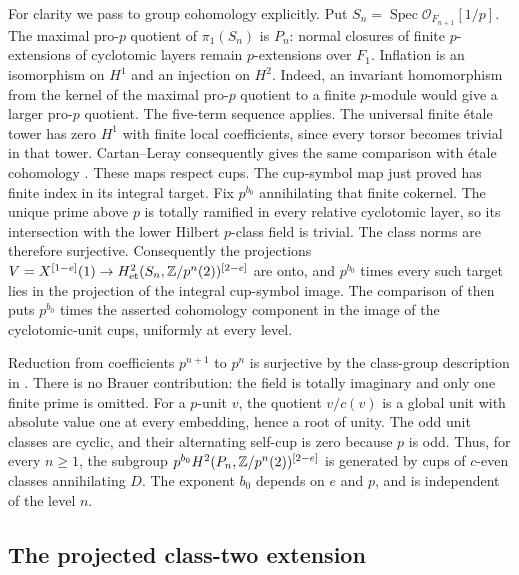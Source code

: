 

For clarity we pass to group cohomology explicitly.
Put $S_n=\operatorname{Spec}\mathcal O_{F_{n+1}}[1/p]$.
The maximal pro-$p$ quotient of $\pi_1(S_n)$ is $P_n$:
normal closures of finite $p$-extensions of cyclotomic layers
remain $p$-extensions over $F_1$.
Inflation is an isomorphism on $H^1$ and an injection on $H^2$.
Indeed, an invariant homomorphism from the kernel of the
maximal pro-$p$ quotient to a finite $p$-module would give
a larger pro-$p$ quotient. The five-term sequence applies.
The universal finite \'etale tower has zero $H^1$ with finite
local coefficients, since every torsor becomes trivial in
that tower. Cartan--Leray consequently gives the same comparison
with \'etale cohomology \cite[Theorem~14.9 and
Proposition~14.13, pp.~96--98]{MilneEtale}.
These maps respect cups. The cup-symbol map just proved has
finite index in its integral target. Fix $p^{b_0}$ annihilating
that finite cokernel. The unique prime above $p$ is totally
ramified in every relative cyclotomic layer, so its intersection
with the lower Hilbert $p$-class field is trivial. The class norms
are therefore surjective. Consequently the projections
$V=X^{[1-e]}(1)\to H^2_{\mathrm{et}}(S_n,\mathbb Z/p^n(2))^{[2-e]}$
are onto, and $p^{b_0}$ times every such target lies in the
projection of the integral cup-symbol image. The comparison of
\cite[\S\S7.1.9--7.1.10, p.~86]{FK} then puts
$p^{b_0}$ times the asserted cohomology component in the image
of the cyclotomic-unit cups, uniformly at every level.

Reduction from coefficients $p^{n+1}$ to $p^n$ is surjective
by the class-group description in \cite[\S7.1.9]{FK}.
There is no Brauer contribution: the field is totally imaginary
and only one finite prime is omitted.
For a $p$-unit $v$, the quotient $v/c(v)$ is a global unit
with absolute value one at every embedding, hence a root of
unity. The odd unit classes are cyclic, and their alternating
self-cup is zero because $p$ is odd. Thus, for every $n\geq1$,
the subgroup $p^{b_0}H^2(P_n,\mathbb Z/p^n(2))^{[2-e]}$
is generated by cups of $c$-even classes annihilating $D$.
The exponent $b_0$ depends on $e$ and $p$, and is independent
of the level $n$.

\subsection{The projected class-two extension}

